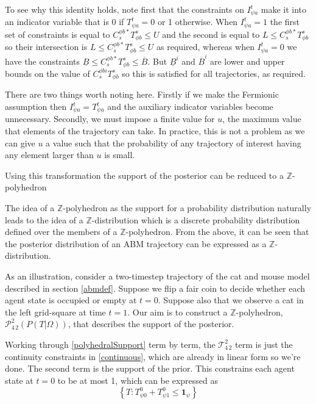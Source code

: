 \documentclass{article}
\begin{document}
To see why this identity holds, note first that the constraints on $I^t_{\psi a}$ make it into an indicator variable that is 0 if $T^t_{\psi a}=0$ or 1 otherwise. When $I^t_{\psi a}=1$ the first set of constraints is equal to $C^{\phi b*}_{s} T^s_{\phi b} \le U$ and the second is equal to $L \le C^{\phi b*}_{s} T^s_{\phi b}$ so their intersection is $L \le  C^{\phi b*}_{s} T^s_{\phi b} \le U$ as required, whereas when $I^t_{\psi a}=0$ we have the constraints $\underline{B} \le C^{\phi b*}_{s} T^s_{\phi b} \le \overline{B}$. But $\underline{B}^i$ and $\overline{B}^i$ are lower and upper bounds on the value of $C^{\phi bi}_{s} T^s_{\phi b}$ so this is satisfied for all trajectories, as required.

There are two things worth noting here. Firstly if we make the Fermionic assumption then $I^t_{\psi a} = T^t_{\psi a}$ and the auxiliary indicator variables become unnecessary. Secondly, we must impose a finite value for $u$, the maximum value that elements of the trajectory can take. In practice, this is not a problem as we can give $u$ a value such that the probability of any trajectory of interest having any element larger than $u$ is small.

Using this transformation the support of the posterior can be reduced to a $\mathbb{Z}$-polyhedron

The idea of a $\mathbb{Z}$-polyhedron as the support for a probability distribution naturally leads to the idea of a $\mathbb{Z}$-distribution which is a discrete probability distribution defined over the members of a $\mathbb{Z}$-polyhedron. From the above, it can be seen that the posterior distribution of an ABM trajectory can be expressed as a $\mathbb{Z}$-distribution.

As an illustration, consider a two-timestep trajectory of the cat and mouse model described in section \ref{abmdef}. Suppose we flip a fair coin to decide whether each agent state is occupied or empty at $t=0$. Suppose also that we observe a cat in the left grid-square at time $t=1$. Our aim is to construct a $\mathbb{Z}$-polyhedron, $\mathcal{P}^2_{4\,2}(P(T|\Omega))$, that describes the support of the posterior.

Working through \eqref{polyhedralSupport} term by term, the $\mathcal{T}^2_{4\,2}$ term is just the continuity constraints in \eqref{continuous}, which are already in linear form so we're done. The second term is the support of the prior. This constrains each agent state at $t=0$ to be at most 1, which can be expressed as
\[
\left\{T:T^0_{\psi 0} + T^0_{\psi 1} \le \mathbf{1}_{\psi}\right\}
\]
\end{document}
